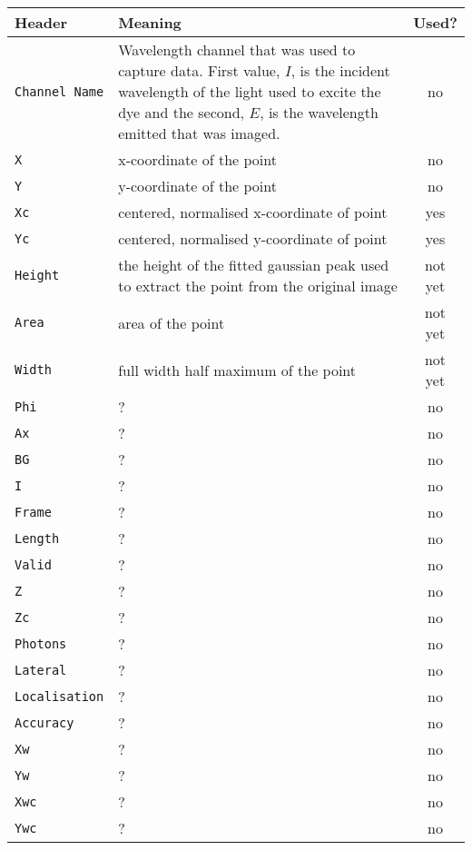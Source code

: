 \begin{center}
	\begin{tabu}{p{1.1cm} X c}
		\toprule
		Header & Meaning & Used? \\
		\midrule
		\texttt{Channel Name} & Wavelength channel that was used to capture data.
			First value, $I$, is the incident wavelength of the light used to
			excite the dye and the second, $E$, is the wavelength emitted that
			was imaged. & no \\
		\texttt{X} & x-coordinate of the point & no \\
		\texttt{Y} & y-coordinate of the point & no \\
		\texttt{Xc} & centered, normalised x-coordinate of point & yes \\
		\texttt{Yc} & centered, normalised y-coordinate of point & yes \\
		\texttt{Height} & the height of the fitted gaussian peak used to
			extract the point from the original image & not yet \\
		\texttt{Area} & area of the point & not yet \\
		\texttt{Width} & full width half maximum of the point & not yet \\
		\texttt{Phi}          & ? & no \\
		\texttt{Ax}           & ? & no \\
		\texttt{BG}           & ? & no \\
		\texttt{I}            & ? & no \\
		\texttt{Frame}        & ? & no \\
		\texttt{Length}       & ? & no \\
		\texttt{Valid}        & ? & no \\
		\texttt{Z}            & ? & no \\
		\texttt{Zc}           & ? & no \\
		\texttt{Photons}      & ? & no \\
		\texttt{Lateral}      & ? & no \\
		\texttt{Localisation} & \qquad ? & no \\
		\texttt{Accuracy}     & ? & no \\
		\texttt{Xw}           & ? & no \\
		\texttt{Yw}           & ? & no \\
		\texttt{Xwc}          & ? & no \\
		\texttt{Ywc}          & ? & no \\
		\bottomrule
	\end{tabu}
\end{center}

